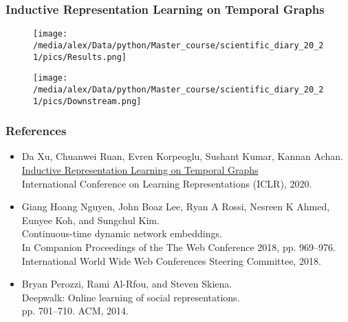 \documentclass[fleqn, xcolor=x11names]{beamer}
\begin{document}
\begin{frame}\frametitle{Inductive Representation Learning on Temporal Graphs}

\begin{figure}[h]
\begin{center}
\texttt{[image: /media/alex/Data/python/Master\_course/scientific\_diary\_20\_21/pics/Results.png]}
\end{center}
\end{figure}

\begin{figure}[h]
\begin{center}
\texttt{[image: /media/alex/Data/python/Master\_course/scientific\_diary\_20\_21/pics/Downstream.png]}
\end{center}
\end{figure}

\end{frame}

\begin{frame}\frametitle{References}

\begin{itemize}
\item Da Xu, Chuanwei Ruan, Evren Korpeoglu, Sushant Kumar, Kannan Achan.\\
\href{https://openreview.net/pdf?id=rJeW1yHYwH}{Inductive Representation Learning on Temporal Graphs}\\
International Conference on Learning Representations (ICLR), 2020.

\item Giang Hoang Nguyen, John Boaz Lee, Ryan A Rossi, Nesreen K Ahmed, Eunyee Koh, and Sungchul Kim.\\
Continuous-time dynamic network embeddings.\\
In Companion Proceedings of
the The Web Conference 2018, pp. 969–976. International World Wide Web Conferences Steering
Committee, 2018.

\item Bryan Perozzi, Rami Al-Rfou, and Steven Skiena.\\
Deepwalk: Online learning of social representations.\\
pp. 701–710. ACM, 2014.

\end{itemize}

\end{frame}
\end{document}
